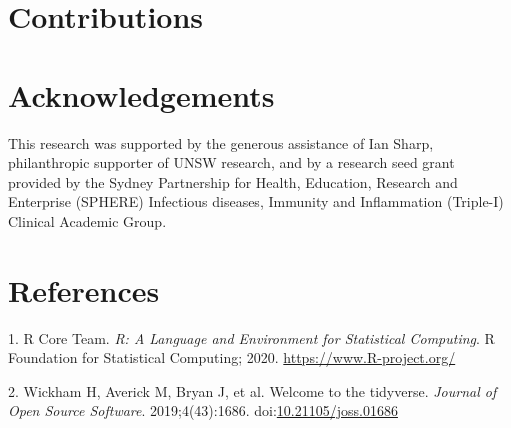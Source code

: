 \documentclass{article}
\begin{document}
\hypertarget{contributions}{%
\section{Contributions}\label{contributions}}

\hypertarget{acknowledgements}{%
\section{Acknowledgements}\label{acknowledgements}}

This research was supported by the generous assistance of Ian Sharp,
philanthropic supporter of UNSW research, and by a research seed grant
provided by the Sydney Partnership for Health, Education, Research and
Enterprise (SPHERE) Infectious diseases, Immunity and Inflammation
(Triple-I) Clinical Academic Group.

\newpage

\hypertarget{references}{%
\section*{References}\label{references}}

\hypertarget{refs}{}
\leavevmode\hypertarget{ref-R-base}{}%
1. R Core Team. \emph{R: A Language and Environment for Statistical
Computing}. R Foundation for Statistical Computing; 2020.
\url{https://www.R-project.org/}

\leavevmode\hypertarget{ref-tidyverse2019}{}%
2. Wickham H, Averick M, Bryan J, et al. Welcome to the tidyverse.
\emph{Journal of Open Source Software}. 2019;4(43):1686.
doi:\href{https://doi.org/10.21105/joss.01686}{10.21105/joss.01686}



\end{document}
